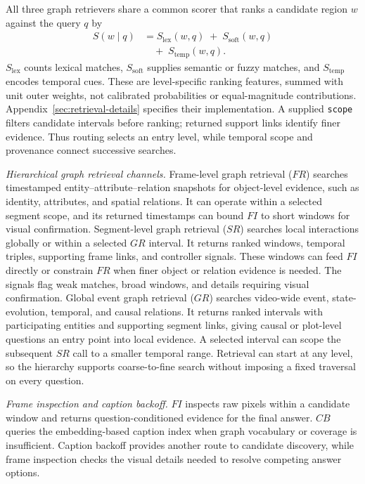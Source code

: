 \documentclass[11pt]{article}
\begin{document}
All three graph retrievers share a common scorer that ranks a candidate region $w$ against the query $q$ by
\begin{equation}
  \begin{split}
  S(w \mid q) &= S_{\mathrm{lex}}(w,q) \;+\; S_{\mathrm{soft}}(w,q) \\
              &\quad +\; S_{\mathrm{temp}}(w,q).
  \end{split}
\end{equation}
$S_{\mathrm{lex}}$ counts lexical matches, $S_{\mathrm{soft}}$ supplies semantic or fuzzy matches, and $S_{\mathrm{temp}}$ encodes temporal cues.
These are level-specific ranking features, summed with unit outer weights, not calibrated probabilities or equal-magnitude contributions.
Appendix~\ref{sec:retrieval-details} specifies their implementation.
A supplied \texttt{scope} filters candidate intervals before ranking; returned support links identify finer evidence.
Thus routing selects an entry level, while temporal scope and provenance connect successive searches.

\emph{Hierarchical graph retrieval channels.}
Frame-level graph retrieval ($FR$) searches timestamped entity--attribute--relation snapshots for object-level evidence, such as identity, attributes, and spatial relations.
It can operate within a selected segment scope, and its returned timestamps can bound $FI$ to short windows for visual confirmation.
Segment-level graph retrieval ($SR$) searches local interactions globally or within a selected $GR$ interval.
It returns ranked windows, temporal triples, supporting frame links, and controller signals.
These windows can feed $FI$ directly or constrain $FR$ when finer object or relation evidence is needed.
The signals flag weak matches, broad windows, and details requiring visual confirmation.
Global event graph retrieval ($GR$) searches video-wide event, state-evolution, temporal, and causal relations.
It returns ranked intervals with participating entities and supporting segment links, giving causal or plot-level questions an entry point into local evidence.
A selected interval can scope the subsequent $SR$ call to a smaller temporal range.
Retrieval can start at any level, so the hierarchy supports coarse-to-fine search without imposing a fixed traversal on every question.

\emph{Frame inspection and caption backoff.}
$FI$ inspects raw pixels within a candidate window and returns question-conditioned evidence for the final answer.
$CB$ queries the embedding-based caption index when graph vocabulary or coverage is insufficient.
Caption backoff provides another route to candidate discovery, while frame inspection checks the visual details needed to resolve competing answer options.
\end{document}
